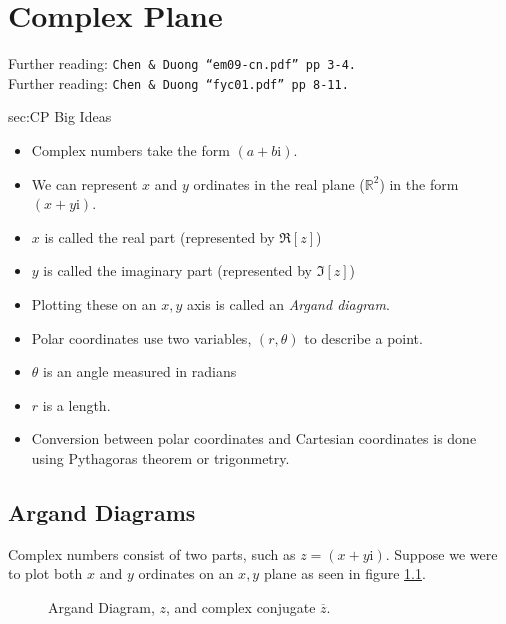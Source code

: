 \chapter{Complex Plane}
\label{chap:CP}
Further reading: \texttt{Chen \& Duong ``em09-cn.pdf'' pp 3-4.} \\
Further reading: \texttt{Chen \& Duong ``fyc01.pdf'' pp 8-11.}

\begin{bigideas}{sec:CP Big Ideas}
\begin{itemize}
  \item Complex numbers take the form $(a + b\text{i})$.
  \item We can represent $x$ and $y$ ordinates in the real plane ($\mathbb{R}^2$)
  in the form $(x + y\text{i})$.
  \item $x$ is called the real part (represented by $\Re[z]$)
  \item $y$ is called the imaginary part (represented by $\Im[z]$)
  \item Plotting these on an $x,y$ axis is called an \emph{Argand diagram}.
  \item Polar coordinates use two variables, $(r,\theta)$ to describe a point.
  \item $\theta$ is an angle measured in radians
  \item $r$ is a length.
  \item Conversion between polar coordinates and Cartesian coordinates is done
  using Pythagoras theorem or trigonmetry.
\end{itemize}
\end{bigideas}

\section{Argand Diagrams}
\label{sec:CP Argand Diagrams}
Complex numbers consist of two parts, such as $z = (x + y\text{i})$. Suppose we
were to plot both $x$ and $y$ ordinates on an $x,y$ plane as seen in figure
\ref{fig:argand}.
\begin{figure}[!htb]
\begin{center}
\end{center}
\caption{Argand Diagram, $z$, and complex conjugate $\overline{z}$.}
\label{fig:argand}
\end{figure}

